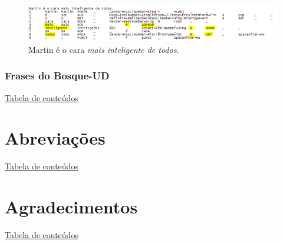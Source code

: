 \documentclass[output=paper,colorlinks,citecolor=brown]{langscibook}
\begin{document}
\begin{figure}
    \centering
    \includegraphics[width=\textwidth,height=\textheight,keepaspectratio]{imagesDrive/image27.png}
    \caption{Martin é o cara \emph{mais inteligente de todos}.}
    \label{fig:comparative2}
\end{figure}{}

\subsection{Frases do Bosque-UD}

\hyperlink{toc}{Tabela de conteúdos\\}

\chapter*{Abreviações}

\hyperlink{toc}{Tabela de conteúdos\\}

\chapter*{Agradecimentos}

\hyperlink{toc}{Tabela de conteúdos\\}

\printbibliography[heading=subbibliography,notkeyword=this]
\end{document}
